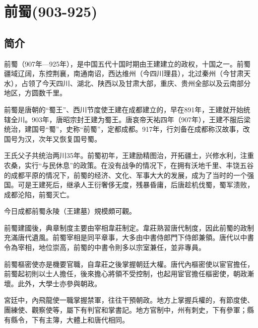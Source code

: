 

\section{前蜀\tiny(903-925)}

\subsection{简介}

前蜀（907年—925年），是中国五代十国时期由王建建立的政权，十国之一。前蜀疆域辽阔，东控荆襄，南通南诏，西达维州（今四川理县），北过秦州（今甘肃天水），占领了今天四川、湖北、陕西以及甘肃大部，重庆、贵州全部以及云南部分地区，方圆数千里。

前蜀是唐朝的“蜀王”、西川节度使王建在成都建立的，早在891年，王建就开始统辖全川。903年，唐昭宗封王建为蜀王。唐哀帝天祐四年（907年），王建不服后梁统治，建国号“蜀”，史称“前蜀”，定都成都。917年，行刘备在成都称汉故事，改国号为汉，次年又恢复国号蜀。

王氏父子共统治两川35年。前蜀初年，王建励精图治，开拓疆土，兴修水利，注重农桑，实行“与民休息”的政策。在没有战争的情况下，在拥有沃地千里、丰饶五谷的成都平原的情况下，前蜀的经济、文化、军事大大的发展，成为了当时的一个强国。可是王建死后，继承人王衍奢侈无度，残暴昏庸，后唐趁机伐蜀，蜀军溃败，成都沦陷，前蜀灭亡。

今日成都前蜀永陵（王建墓）規模頗可觀。

前蜀建國後，典章制度主要由宰相韋莊制定。韋莊熟習唐代制度，因此前蜀的政制充滿唐代遺風。前蜀宰相是同平章事，大多由中書侍郎門下侍郎兼領。唐代以中書令為宰相，地位崇高，前蜀的中書令則多以宗室兼任，並非專員。

前蜀樞密使亦是機要官職，自韋莊之後掌握朝廷大權。唐代內樞密使以宦官擔任，前蜀起初則以士人擔任，後來擔心將領不受控制，也起用宦官擔任樞密使，朝政漸壞。此外，大學士亦參與朝政。

宮廷中，內飛龍使一職掌握禁軍，往往干預朝政。地方上掌握兵權的，有節度使、團練使、觀察使等，屬下有判官和掌書記。地方官制中，州有刺史，下有參軍；縣有縣令，下有主簿，大體上和唐代相同。






